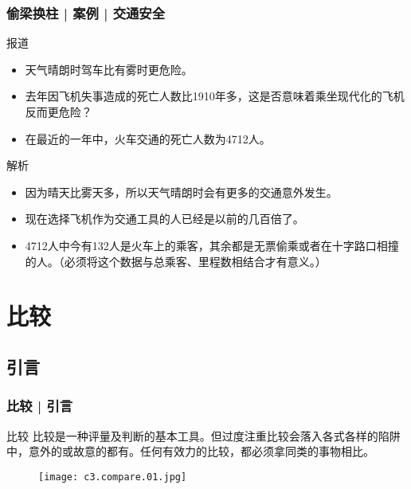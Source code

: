 \begin{frame}
  \frametitle{偷梁换柱 | 案例 | 交通安全}
  \begin{block}{报道}
    \begin{itemize}
      \item 天气晴朗时驾车比有雾时更危险。
      \item 去年因飞机失事造成的死亡人数比1910年多，这是否意味着乘坐现代化的飞机反而更危险？
      \item 在最近的一年中，火车交通的死亡人数为4712人。
    \end{itemize}
  \end{block}
  \pause
  \begin{block}{解析}
    \begin{itemize}
      \item 因为晴天比雾天多，所以天气晴朗时会有更多的交通意外发生。
      \item 现在选择飞机作为交通工具的人已经是以前的几百倍了。
      \item 4712人中今有132人是火车上的乘客，其余都是无票偷乘或者在十字路口相撞的人。（必须将这个数据与总乘客、里程数相结合才有意义。）
    \end{itemize}
  \end{block}
\end{frame}

\section{比较}
\subsection{引言}
\begin{frame}
  \frametitle{比较 | 引言}
  \begin{block}{比较}
    比较是一种评量及判断的基本工具。但过度注重比较会落入各式各样的陷阱中，意外的或故意的都有。任何有效力的比较，都必须拿同类的事物相比。
    \vspace{-2em}
    \begin{figure}
      \centering
      \texttt{[image: c3.compare.01.jpg]}
    \end{figure}
  \end{block}
\end{frame}

